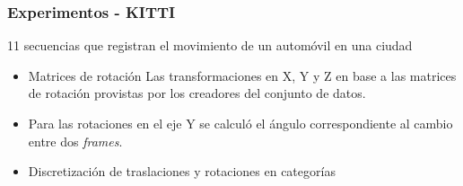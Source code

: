 \documentclass{beamer}
\begin{document}
\begin{frame}
\frametitle{Experimentos - KITTI}
\vfill
11 secuencias que registran el movimiento de un automóvil en una ciudad\vfill
\begin{figure}
\centering
{}
\end{figure}
\vfill
\begin{itemize}
    \item Matrices de rotación Las transformaciones en X, Y y Z en base a las matrices de rotación provistas por los creadores del conjunto de datos.
    \item Para las rotaciones en el eje Y se calculó el ángulo correspondiente al cambio entre dos \textit{frames}.
    \item Discretización de traslaciones y rotaciones en categorías
\end{itemize}
\vfill
\end{frame}
\end{document}
